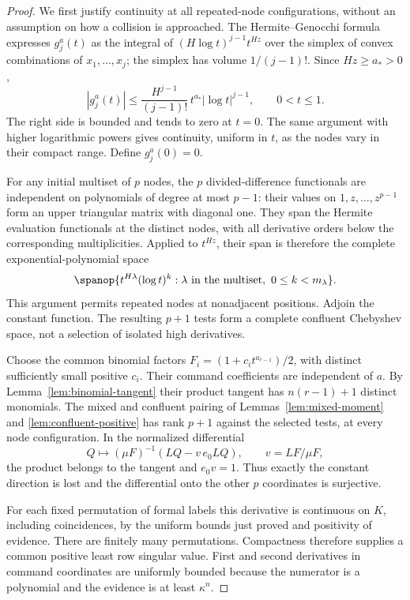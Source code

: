 \begin{proof}
We first justify continuity at all repeated-node configurations, without
an assumption on how a collision is approached. The Hermite--Genocchi
formula \cite{deBoor} expresses $g_j^a(t)$ as the integral of
$(H\log t)^{j-1}t^{Hz}$ over the simplex of convex combinations of
$x_1,\ldots,x_j$; the simplex has volume $1/(j-1)!$.
Since $Hz\ge a_*>0$,
\[
 |g_j^a(t)|\le
  \frac{H^{j-1}}{(j-1)!}\,t^{a_*}|\log t|^{j-1},
 \qquad 0<t\le1.
\]
The right side is bounded and tends to zero at $t=0$. The same argument
with higher logarithmic powers gives continuity, uniform in $t$, as the
nodes vary in their compact range. Define $g_j^a(0)=0$.

For any initial multiset of $p$ nodes, the $p$ divided-difference
functionals are independent on polynomials of degree at most $p-1$:
their values on $1,z,\ldots,z^{p-1}$ form an upper triangular matrix
with diagonal one. They span the Hermite evaluation functionals at the
distinct nodes, with all derivative orders below the corresponding
multiplicities. Applied to $t^{Hz}$, their span is therefore the complete
exponential-polynomial space
\[
 \spanop\{t^{H\lambda}(\log t)^k:
          \lambda\text{ in the multiset},\ 0\le k<m_\lambda\}.
\]
This argument permits repeated nodes at nonadjacent positions. Adjoin the
constant function. The resulting $p+1$ tests form a complete confluent
Chebyshev space, not a selection of isolated high derivatives.

Choose the common binomial factors
$F_i=(1+c_it^{a_{r-1}})/2$, with distinct sufficiently small positive
$c_i$. Their command coefficients are independent of $a$. By
Lemma~\ref{lem:binomial-tangent} their product tangent has
$n(r-1)+1$ distinct monomials. The mixed and confluent pairing of
Lemmas~\ref{lem:mixed-moment} and \ref{lem:confluent-positive} has
rank $p+1$ against the selected tests, at every node configuration.
In the normalized differential
\[
 Q\longmapsto(\mu F)^{-1}(LQ-v\,e_0LQ),
 \qquad v=LF/\mu F,
\]
the product belongs to the tangent and $e_0v=1$. Thus exactly the
constant direction is lost and the differential onto the other $p$
coordinates is surjective.

For each fixed permutation of formal labels this derivative is continuous
on $K$, including coincidences, by the uniform bounds just proved and
positivity of evidence. There are finitely many permutations. Compactness
therefore supplies a common positive least row singular value. First and
second derivatives in command coordinates are uniformly bounded because
the numerator is a polynomial and the evidence is at least $\kappa^n$.


\end{proof}
